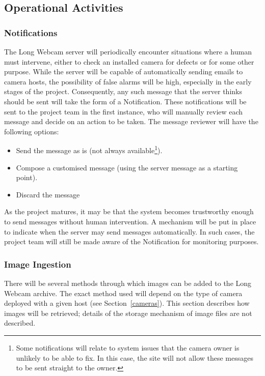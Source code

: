 \documentclass[11pt]{article}
\begin{document}
\subsection{Operational Activities}

\subsubsection{Notifications}
The Long Webcam server will periodically encounter situations where a human must intervene, either to check an installed camera for defects or for some other purpose. While the server will be capable of automatically sending emails to camera hosts, the possibility of false alarms will be high, especially in the early stages of the project. Consequently, any such message that the server thinks should be sent will take the form of a Notification. These notifications will be sent to the project team in the first instance, who will manually review each message and decide on an action to be taken. The message reviewer will have the following options:

\begin{itemize}
\item Send the message as is (not always available\footnote{Some notifications will relate to system issues that the camera owner is unlikely to be able to fix. In this case, the site will not allow these messages to be sent straight to the owner.}).
\item Compose a customised message (using the server message as a starting point).
\item Discard the message
\end{itemize}

As the project matures, it may be that the system becomes trustworthy enough to send messages without human intervention. A mechanism will be put in place to indicate when the server may send messages automatically. In such cases, the project team will still be made aware of the Notification for monitoring purposes.

\subsubsection{Image Ingestion}
There will be several methods through which images can be added to the Long Webcam archive. The exact method used will depend on the type of camera deployed with a given host (see Section~\ref{cameras}). This section describes how images will be retrieved; details of the storage mechanism of image files are not described.
\end{document}
